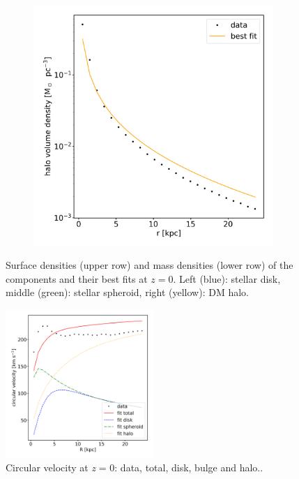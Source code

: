 \begin{figure}
\begin{subfigure}[b]{0.3\textwidth}
    	\label{fig:spher_voldens_fit}
    \end{subfigure}
    ~ %
    \begin{subfigure}[b]{0.3\textwidth}
        \centering
    	\includegraphics[width=\textwidth]{plots/Auriga/volume_dens_halo_fit_data.png}
	    \label{fig:halo_voldens_fit}
    \end{subfigure}
    \caption{Surface densities (upper row) and mass densities (lower row) of the components and their best fits at $\textit{z}=0$. Left (blue): stellar disk, middle (green): stellar spheroid, right (yellow): \ac{DM} halo.}\label{fig:single_pot_fits}
\end{figure}

\begin{figure}[htbp]
\centering
	\includegraphics[width=0.5\textwidth]{plots/Auriga/circ_vel_fit_data_test.png}
	\caption{Circular velocity at \textit{z} = 0: data, total, disk, bulge and halo..}
	\label{fig:circ_vel_fit}
\end{figure}


